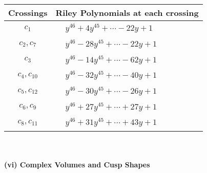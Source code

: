 \documentclass[1p]{elsarticle_modified}
\theoremstyle{definition}
\begin{document}
\begin{tabular}{m{50pt}|m{274pt}}
Crossings & \hspace{64pt}Riley Polynomials at each crossing \\
\hline $$\begin{aligned}c_{1}\end{aligned}$$&$\begin{aligned}
&y^{46}+4 y^{45}+\cdots-22 y+1
\end{aligned}$\\
\hline $$\begin{aligned}c_{2},c_{7}\end{aligned}$$&$\begin{aligned}
&y^{46}-28 y^{45}+\cdots-22 y+1
\end{aligned}$\\
\hline $$\begin{aligned}c_{3}\end{aligned}$$&$\begin{aligned}
&y^{46}-14 y^{45}+\cdots-62 y+1
\end{aligned}$\\
\hline $$\begin{aligned}c_{4},c_{10}\end{aligned}$$&$\begin{aligned}
&y^{46}-32 y^{45}+\cdots-40 y+1
\end{aligned}$\\
\hline $$\begin{aligned}c_{5},c_{12}\end{aligned}$$&$\begin{aligned}
&y^{46}-30 y^{45}+\cdots-26 y+1
\end{aligned}$\\
\hline $$\begin{aligned}c_{6},c_{9}\end{aligned}$$&$\begin{aligned}
&y^{46}+27 y^{45}+\cdots+27 y+1
\end{aligned}$\\
\hline $$\begin{aligned}c_{8},c_{11}\end{aligned}$$&$\begin{aligned}
&y^{46}+31 y^{45}+\cdots+43 y+1
\end{aligned}$\\
\hline
\end{tabular}\\~\\
\newpage\flushleft \textbf{(vi) Complex Volumes and Cusp Shapes}
\end{document}
